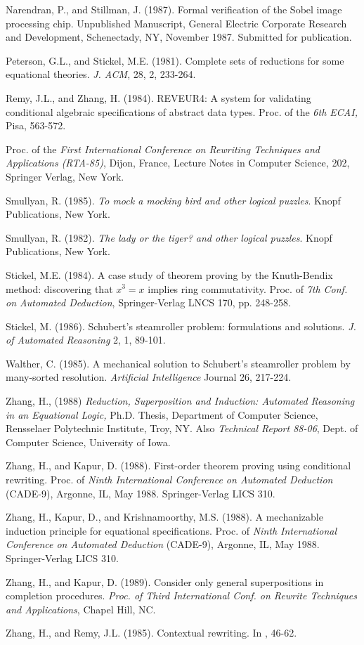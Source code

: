 \begin{thebibliography}{99}
 Narendran, P., and Stillman, J. (1987).
Formal verification of the Sobel image processing chip. Unpublished
Manuscript, General Electric Corporate Research and Development,
Schenectady, NY, November 1987. Submitted for publication.

Peterson, G.L., and Stickel, M.E. (1981).
Complete sets of reductions for some equational theories. {\em J.
ACM}, 28, 2, 233-264.

 Remy, J.L., and Zhang, H. (1984). 
REVEUR4: A system for validating conditional algebraic specifications
of abstract data types. Proc. of the {\em 6th ECAI,} Pisa, 563-572.

Proc. of the {\em First International Conference on
Rewriting Techniques and Applications (RTA-85)}, Dijon, France,
Lecture Notes in Computer Science, 202, Springer Verlag, New York.

Smullyan, R. (1985). {\em To mock a mocking bird
and other logical puzzles}. Knopf Publications, New York.

Smullyan, R. (1982). {\em The lady or the tiger?
and other logical puzzles}. Knopf Publications, New York.

Stickel, M.E. (1984). A case study of theorem proving by the
Knuth-Bendix method: discovering that $x^3 = x$ implies ring
commutativity. Proc. of {\em 7th Conf. on Automated Deduction},
Springer-Verlag LNCS 170, pp. 248-258.

Stickel, M. (1986). Schubert's steamroller problem:
formulations and solutions. {\em J. of Automated Reasoning} 2, 1,
89-101.

Walther, C. (1985). A mechanical solution to
Schubert's steamroller problem by many-sorted resolution. {\em
Artificial Intelligence} Journal 26, 217-224.

Zhang, H., (1988) {\em Reduction, Superposition and Induction: Automated
Reasoning in an Equational Logic,} Ph.D. Thesis, Department of
Computer Science, Rensselaer Polytechnic Institute, Troy, NY.
Also {\em Technical Report 88-06}, Dept. of Computer Science,
University of Iowa.

 Zhang, H., and Kapur, D. (1988). First-order
theorem proving using conditional rewriting. 
Proc. of {\em Ninth International
Conference on Automated Deduction} (CADE-9), Argonne, IL, May 1988.
Springer-Verlag LICS 310.

 Zhang, H., Kapur, D., and Krishnamoorthy,
M.S.  (1988). A mechanizable induction principle for equational
specifications. 
Proc. of {\em Ninth International
Conference on Automated Deduction} (CADE-9), Argonne, IL, May 1988.
Springer-Verlag LICS 310.

 Zhang, H., and Kapur, D. (1989). Consider
only general superpositions in completion procedures. {\em Proc.  of
Third International Conf. on Rewrite Techniques and Applications},
Chapel Hill, NC.

Zhang, H., and Remy, J.L. (1985). Contextual
rewriting. In \cite{RTA85}, 46-62.

\end{thebibliography}
